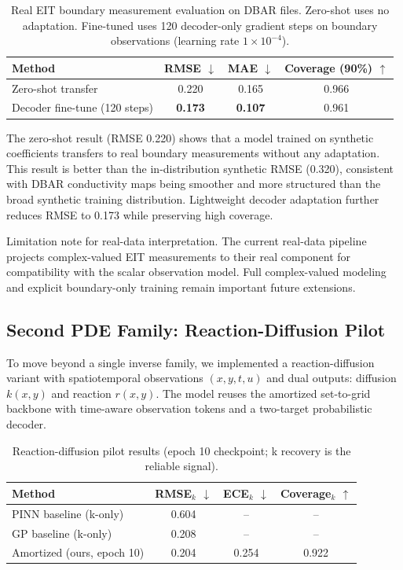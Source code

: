 \documentclass{article}
\begin{document}
\begin{table}[H]
\centering
\caption{Real EIT boundary measurement evaluation on DBAR files. Zero-shot uses no adaptation. Fine-tuned uses 120 decoder-only gradient steps on boundary observations (learning rate $1\times 10^{-4}$).}
\begin{tabular}{lccc}
\toprule
Method & RMSE $\downarrow$ & MAE $\downarrow$ & Coverage (90\%) $\uparrow$ \\
\midrule
Zero-shot transfer & 0.220 & 0.165 & 0.966 \\
Decoder fine-tune (120 steps) & \textbf{0.173} & \textbf{0.107} & 0.961 \\
\bottomrule
\end{tabular}
\end{table}

The zero-shot result (RMSE 0.220) shows that a model trained on synthetic coefficients transfers to real boundary measurements without any adaptation. This result is better than the in-distribution synthetic RMSE (0.320), consistent with DBAR conductivity maps being smoother and more structured than the broad synthetic training distribution. Lightweight decoder adaptation further reduces RMSE to 0.173 while preserving high coverage.

Limitation note for real-data interpretation. The current real-data pipeline projects complex-valued EIT measurements to their real component for compatibility with the scalar observation model. Full complex-valued modeling and explicit boundary-only training remain important future extensions.

\subsection{Second PDE Family: Reaction-Diffusion Pilot}
To move beyond a single inverse family, we implemented a reaction-diffusion variant with spatiotemporal observations $(x, y, t, u)$ and dual outputs: diffusion $k(x, y)$ and reaction $r(x, y)$. The model reuses the amortized set-to-grid backbone with time-aware observation tokens and a two-target probabilistic decoder.

\begin{table}[H]
\centering
\caption{Reaction-diffusion pilot results (epoch 10 checkpoint; k recovery is the reliable signal).}
\begin{tabular}{lccc}
\toprule
Method & RMSE$_k$ $\downarrow$ & ECE$_k$ $\downarrow$ & Coverage$_k$ $\uparrow$ \\
\midrule
PINN baseline (k-only) & 0.604 & -- & -- \\
GP baseline (k-only) & 0.208 & -- & -- \\
Amortized (ours, epoch 10) & 0.204 & 0.254 & 0.922 \\
\bottomrule
\end{tabular}
\end{table}
\end{document}
